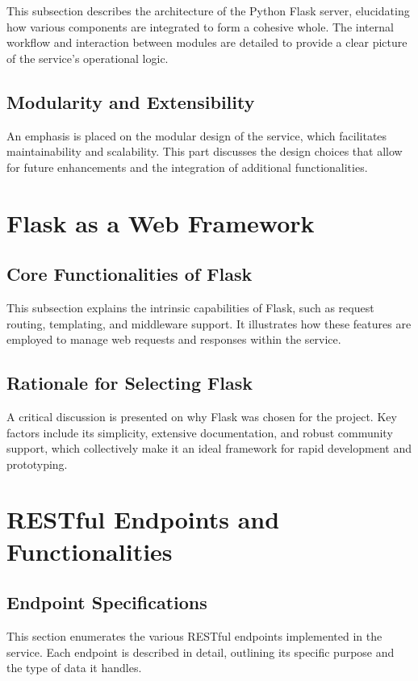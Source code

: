 This subsection describes the architecture of the Python Flask server, elucidating how various components are integrated to form a cohesive whole. The internal workflow and interaction between modules are detailed to provide a clear picture of the service's operational logic.

\subsection{Modularity and Extensibility}

An emphasis is placed on the modular design of the service, which facilitates maintainability and scalability. This part discusses the design choices that allow for future enhancements and the integration of additional functionalities.

\section{Flask as a Web Framework}

\subsection{Core Functionalities of Flask}
This subsection explains the intrinsic capabilities of Flask, such as request routing, templating, and middleware support. It illustrates how these features are employed to manage web requests and responses within the service.

\subsection{Rationale for Selecting Flask}
A critical discussion is presented on why Flask was chosen for the project. Key factors include its simplicity, extensive documentation, and robust community support, which collectively make it an ideal framework for rapid development and prototyping.

\section{RESTful Endpoints and Functionalities}
\subsection{Endpoint Specifications}
This section enumerates the various RESTful endpoints implemented in the service. Each endpoint is described in detail, outlining its specific purpose and the type of data it handles.
